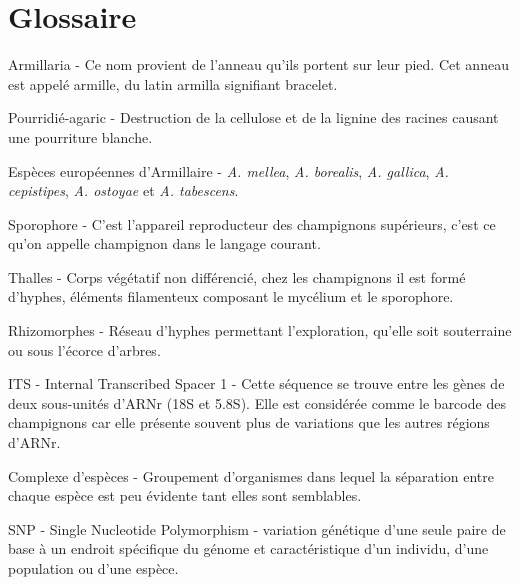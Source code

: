 
\pagestyle{empty}

\section*{Glossaire}

\label{bib:biblioI}
Armillaria - Ce nom provient de l’anneau qu’ils portent sur leur pied. Cet anneau est appelé armille, du latin armilla signifiant bracelet.

\label{bib:biblioII}
Pourridié-agaric - Destruction de la cellulose et de la lignine des racines causant une pourriture blanche.

\label{bib:biblioIII}
Espèces européennes d'Armillaire - \textit{A. mellea}, \textit{A. borealis}, \textit{A. gallica}, \textit{A. cepistipes}, \textit{A. ostoyae} et \textit{A. tabescens}.

\label{bib:biblioIV}
Sporophore - C'est l'appareil reproducteur des champignons supérieurs, c'est ce qu'on appelle champignon dans le langage courant.

\label{bib:biblioV}
Thalles - Corps végétatif non différencié, chez les champignons il est formé d'hyphes, éléments filamenteux composant le mycélium et le sporophore.

\label{bib:biblioVI}
Rhizomorphes - Réseau d'hyphes permettant l'exploration, qu'elle soit souterraine ou sous l'écorce d'arbres.

\label{bib:biblioVII}
ITS - Internal Transcribed Spacer 1 - Cette séquence se trouve entre les gènes de deux sous-unités d'ARNr (18S et 5.8S). Elle est considérée comme le barcode des champignons car elle présente souvent plus de variations que les autres régions d'ARNr.

\label{bib:biblioVIII}
Complexe d'espèces - Groupement d'organismes dans lequel la séparation entre chaque espèce est peu évidente tant elles sont semblables.

\label{bib:biblioIX}
SNP - Single Nucleotide Polymorphism - variation génétique d'une seule paire de base à un endroit spécifique du génome et caractéristique d'un individu, d'une population ou d'une espèce.